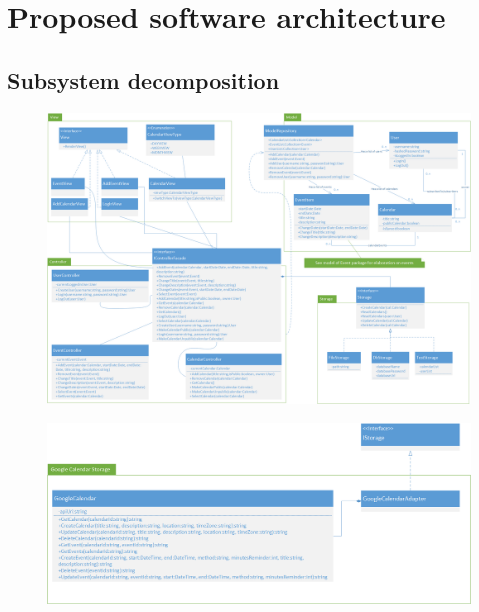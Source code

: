 \documentclass[10pt]{report}
\numberwithin{equation}{section} %
\numberwithin{figure}{section} %
\numberwithin{table}{section} %
\begin{document}
\section{Proposed software architecture}

\subsection{Subsystem decomposition}
\begin{figure}[H]
  \includegraphics[scale=0.40]{figures/classdiagram.png}
\end{figure}

\begin{figure}[H]
  \includegraphics[scale=0.40]{figures/google_adapter.png}
\end{figure}
\end{document}
